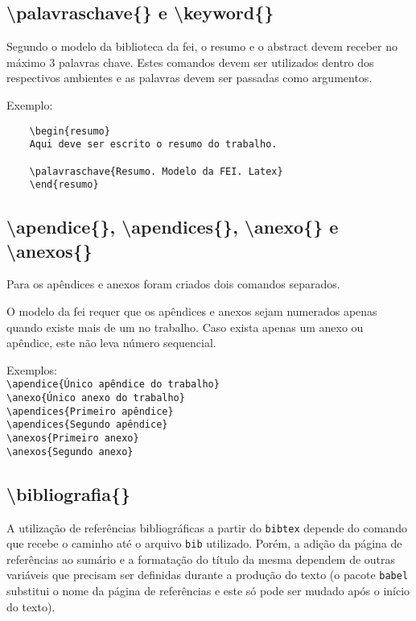 \documentclass{fei}
\begin{document}
    \subsection{\textbackslash palavraschave\{\} e \textbackslash keyword\{\}}
    Segundo o modelo da biblioteca da \gls{fei}, o resumo e o abstract devem receber no máximo 3 palavras chave. Estes comandos devem ser utilizados dentro dos respectivos ambientes e as palavras devem ser passadas como argumentos.

    Exemplo:
    \begin{verbatim}
    \begin{resumo}
    Aqui deve ser escrito o resumo do trabalho.

    \palavraschave{Resumo. Modelo da FEI. Latex}
    \end{resumo}
    \end{verbatim}
    
    \subsection{\textbackslash apendice\{\}, \textbackslash apendices\{\}, \textbackslash anexo\{\} e \textbackslash anexos\{\}}
    Para os apêndices e anexos foram criados dois comandos separados.

    O modelo da \gls{fei} requer que os apêndices e anexos sejam numerados apenas quando existe mais de um no trabalho. Caso exista apenas um anexo ou apêndice, este não leva número sequencial.

    Exemplos: \\
    \verb+\apendice{Único apêndice do trabalho}+ \\
    \verb+\anexo{Único anexo do trabalho}+ \\

    \noindent{}
    \verb+\apendices{Primeiro apêndice}+\\
    \verb+\apendices{Segundo apêndice}+\\

    \noindent{}
    \verb+\anexos{Primeiro anexo}+\\
    \verb+\anexos{Segundo anexo}+\\

    \subsection{\textbackslash bibliografia\{\}}
    A utilização de referências bibliográficas a partir do \texttt{bibtex} depende do comando \verb++ que recebe o caminho até o arquivo \texttt{bib} utilizado. Porém, a adição da página de referências ao sumário e a formatação do título da mesma dependem de outras variáveis que precisam ser definidas durante a produção do texto (o pacote \texttt{babel} substitui o nome da página de referências e este só pode ser mudado após o início do texto).
\end{document}
